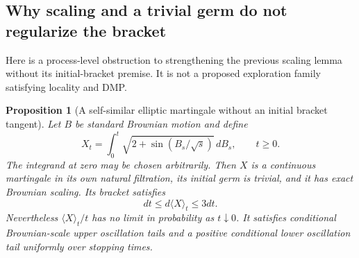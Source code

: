 \documentclass[11pt]{article}
\newtheorem{proposition}[theorem]{Proposition}
\theoremstyle{definition}\newtheorem{definition}[theorem]{Definition}
\theoremstyle{remark}\newtheorem{remark}[theorem]{Remark}
\begin{document}
\subsection{Why scaling and a trivial germ do not regularize the bracket}
\label{sec:elliptic-selfsimilar-counterexample}

Here is a process-level obstruction to strengthening the previous
scaling lemma without its initial-bracket premise. It is not a
proposed exploration family satisfying locality and DMP.

\begin{proposition}[A self-similar elliptic martingale without an initial bracket tangent]
\label{prop:selfsimilar-elliptic-no-tangent}
Let $B$ be standard Brownian motion and define
\[
 X_t=\int_0^t\sqrt{2+\sin(B_s/\sqrt s)}\,dB_s,
 \qquad t\ge0.
 \tag{AC4}
\]
The integrand at zero may be chosen arbitrarily. Then $X$ is a
continuous martingale in its own natural filtration, its initial germ
is trivial, and it has exact Brownian scaling. Its bracket satisfies
\[
 dt\le d\langle X\rangle_t\le3dt.
 \tag{AC5}
\]
Nevertheless $\langle X\rangle_t/t$ has no limit in probability as
$t\downarrow0$. It satisfies conditional Brownian-scale upper
oscillation tails and a positive conditional lower oscillation tail
uniformly over stopping times.
\end{proposition}
\end{document}
